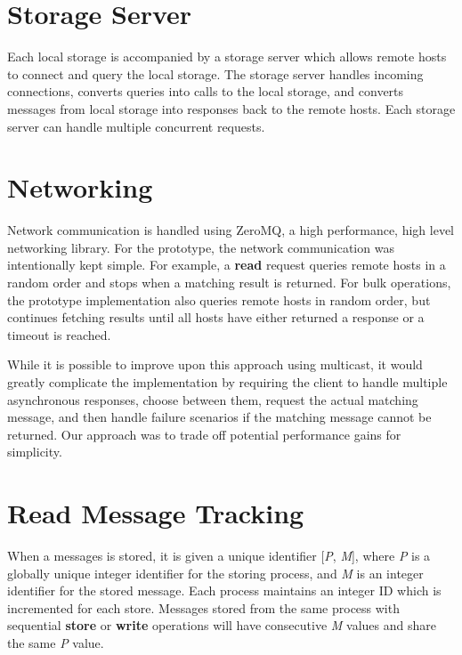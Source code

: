 \section{Storage Server}

Each local storage is accompanied by a storage server which allows remote hosts to connect and query the local storage. The storage server handles incoming connections, converts queries into calls to the local storage, and converts messages from local storage into responses back to the remote hosts. Each storage server can handle multiple concurrent requests.

\section{Networking}

Network communication is handled using ZeroMQ\cite{hintjens2013zeromq}, a high performance, high level networking library. For the prototype, the network communication was intentionally kept simple. For example, a \textbf{read} request queries remote hosts in a random order and stops when a matching result is returned. For bulk operations, the prototype implementation also queries remote hosts in random order, but continues fetching results until all hosts have either returned a response or a timeout is reached.

While it is possible to improve upon this approach using multicast, it would greatly complicate the implementation by requiring the client to handle multiple asynchronous responses, choose between them, request the actual matching message, and then handle failure scenarios if the matching message cannot be returned. Our approach was to trade off potential performance gains for simplicity.

\section{Read Message Tracking}\label{sec:readmessages}

When a messages is stored, it is given a unique identifier [\textit{P}, \textit{M}], where \textit{P} is a globally unique integer identifier for the storing process, and \textit{M} is an integer identifier for the stored message. Each process maintains an integer ID which is incremented for each store. Messages stored from the same process with sequential \textbf{store} or \textbf{write} operations will have consecutive \textit{M} values and share the same \textit{P} value.

